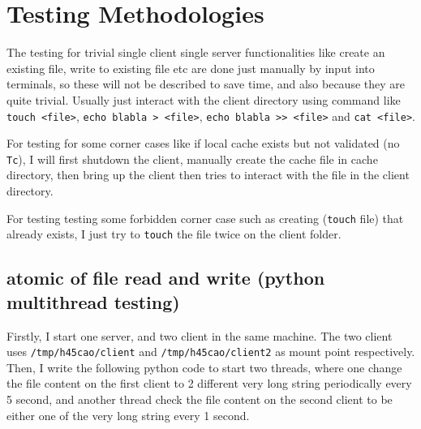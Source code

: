 \documentclass[11pt,a4paper]{article}
\begin{document}
\section{Testing Methodologies}

The testing for trivial single client single server functionalities like create an existing file, write to existing file etc are done just manually by input into terminals, so these will not be described to save time, and also because they are quite trivial. Usually just interact with the client directory using command like \texttt{touch <file>}, \texttt{echo blabla > <file>}, \texttt{echo blabla >> <file>} and \texttt{cat <file>}.

For testing for some corner cases like if local cache exists but not validated (no \texttt{Tc}), I will first shutdown the client, manually create the cache file in cache directory, then bring up the client then tries to interact with the file in the client directory.

For testing testing some forbidden corner case such as creating (\texttt{touch} file) that already exists, I just try to \texttt{touch} the file twice on the client folder.

\subsection{atomic of file read and write (python multithread testing)}
Firstly, I start one server, and two client in the same machine. The two client uses \texttt{/tmp/h45cao/client} and \texttt{/tmp/h45cao/client2} as mount point respectively. Then, I write the following python code to start two threads, where one change the file content on the first client to 2 different very long string periodically every 5 second, and another thread check the file content on the second client to be either one of the very long string every 1 second.
\end{document}

